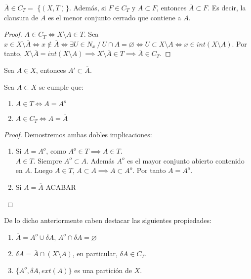 \begin{properties}
  $\overline{A} \in C_T =$ \{$(X,T)\}$. Además, si $F \in C_T$ y $A \subset F$, entonces $\overline{A} \subset F$. Es decir, la clausura de $A$ es el menor conjunto cerrado que contiene a $A$.
\end{properties}
\begin{proof}
  $\overline{A} \in C_T \Leftrightarrow X \setminus \overline{A} \in T$. Sea $x \in X \setminus \overline{A} \Leftrightarrow x \not\in \overline{A} \Leftrightarrow \exists U \in N_x\ /\ U \cap A = \varnothing \Leftrightarrow U \subset X \setminus A \Leftrightarrow x \in int(X \setminus A)$. Por tanto, $X \setminus \overline{A} = int(X \setminus A) \implies X \setminus \overline{A} \in T \implies \overline{A} \in C_T$.
\end{proof}
\begin{properties}
    Sea $A \in X$, entonces $A' \subset \overline{A}$.
\end{properties}
\begin{ncor}
  Sea $A \subset X$ se cumple que:
  \begin{enumerate}
    \item $A \in T \Leftrightarrow A=A^o$
    \item $A \in C_T \Leftrightarrow A=\overline{A}$
  \end{enumerate}
\end{ncor}
\begin{proof}
  Demostremos ambas dobles implicaciones:
  \begin{enumerate}
    \item \fbox{$\Leftarrow$} Si $A=A^o$, como $A^o \in T \implies A \in T$. \\ \fbox{$\Rightarrow$} $A \in T$. Siempre $A^o \subset A$. Además $A^o$ es el mayor conjunto abierto contenido en $A$. Luego $A \in T$, $A \subset A \implies A \subset A^o$. Por tanto $A=A^o$.
    \item \fbox{$\Leftarrow$} Si $A=\overline{A}$ ACABAR
  \end{enumerate}
\end{proof}

\begin{properties}
  De lo dicho anteriormente caben destacar las siguientes propiedades:
  \begin{enumerate}
    \item $\overline{A}=A^o \cup \delta A$, $A^o \cap \delta A = \varnothing$
    \item $\delta A = \overline{A} \cap \overline{(X \setminus A)}$, en particular, $\delta A \in C_T$.
    \item $\{A^o,\delta A, ext(A)\}$ es una partición de $X$.
  \end{enumerate}
\end{properties}

